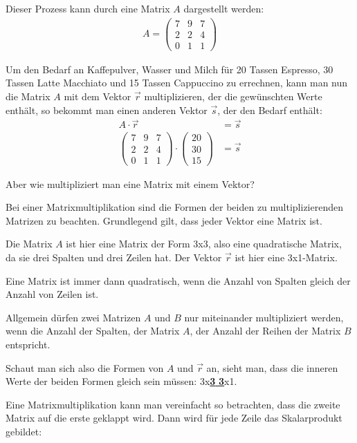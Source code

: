 \begin{flushleft}
Dieser Prozess kann durch eine Matrix $A$ dargestellt werden:
\begin{align}
    A = \begin{pmatrix}
        7 & 9 & 7 \\
        2 & 2 & 4 \\
        0 & 1 & 1
    \end{pmatrix}
\end{align}

Um den Bedarf an Kaffepulver, Wasser und Milch für 20 Tassen Espresso, 30 Tassen Latte Macchiato und 15 Tassen Cappuccino zu errechnen,
kann man nun die Matrix $A$ mit dem Vektor $\vec{r}$ multiplizieren, der die gewünschten Werte enthält,
so bekommt man einen anderen Vektor $\vec{s}$, der den Bedarf enthält:
\begin{align}
    A\cdot\vec{r}&=\vec{s} \\
    \begin{pmatrix}
        7 & 9 & 7 \\
        2 & 2 & 4 \\
        0 & 1 & 1
    \end{pmatrix}\cdot
    \begin{pmatrix}
        20 \\
        30 \\
        15
    \end{pmatrix}&=\vec{s}
\end{align}

Aber wie multipliziert man eine Matrix mit einem Vektor?
\newline

Bei einer Matrixmultiplikation sind die Formen der beiden zu multiplizierenden Matrizen zu beachten.
Grundlegend gilt, dass jeder Vektor eine Matrix ist.

Die Matrix $A$ ist hier eine Matrix der Form 3x3, also eine quadratische Matrix, da sie drei Spalten und drei Zeilen hat.
Der Vektor $\vec{r}$ ist hier eine 3x1-Matrix.

Eine Matrix ist immer dann quadratisch, wenn die Anzahl von Spalten gleich der Anzahl von Zeilen ist.

Allgemein dürfen zwei Matrizen $A$ und $B$ nur miteinander multipliziert werden, wenn die Anzahl der Spalten, der Matrix $A$, der Anzahl der Reihen der Matrix $B$ entspricht.

Schaut man sich also die Formen von $A$ und $\vec{r}$ an, sieht man, dass die inneren Werte der beiden Formen gleich sein müssen: 3x\underline{\textbf{3} \textbf{3}}x1.
\newline

Eine Matrixmultiplikation kann man vereinfacht so betrachten, dass die zweite Matrix auf die erste geklappt wird.
Dann wird für jede Zeile das Skalarprodukt gebildet:
\end{flushleft}

